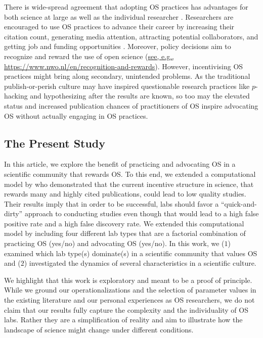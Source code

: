 \documentclass[meta, authordate,issue]{jote-new-article}
\begin{document}
There is wide-spread agreement that adopting OS practices has advantages for both science at large as well as the individual researcher \parencites{AllenMehler2019}{mckiernan_how_2016}{markowetz_five_2015}. Researchers are encouraged to use OS practices to advance their career by increasing their citation count, generating media attention, attracting potential collaborators, and getting job and funding opportunities \parencites{mckiernan_how_2016}. Moreover, policy decisions aim to recognize and reward the use of open science (\href{https://www.nwo.nl/en/recognition-and-rewards}{see, e.g., https://www.nwo.nl/en/recognition-and-rewards}). However, incentivising OS practices might bring along secondary, unintended problems. As the traditional publish-or-perish culture may have inspired questionable research practices like $p$-hacking and hypothesizing after the results are known, so too may the elevated status and increased publication chances of practitioners of OS inspire advocating OS without actually engaging in OS practices.

\subsection{The Present Study}

In this article, we explore the benefit of practicing and advocating OS in a scientific community that rewards OS. To this end, we extended a computational model by \textcite{SmaldinoMcelreath2016} who demonstrated that the current incentive structure in science, that rewards many and highly cited publications, could lead to low quality studies. Their results imply that in order to be successful, labs should favor a ``quick-and-dirty'' approach to conducting studies even though that would lead to a high false positive rate and a high false discovery rate. We extended this computational model by including four different lab types that are a factorial combination of practicing OS (yes/no) and advocating OS (yes/no). In this work, we ($1$) examined which lab type(s) dominate(s) in a scientific community that values OS and ($2$) investigated the dynamics of several characteristics in a scientific culture.

We highlight that this work is exploratory and meant to be a proof of principle. While we ground our operationalizations and the selection of parameter values in the existing literature and our personal experiences as OS researchers, we do not claim that our results fully capture the complexity and the individuality of OS labs. Rather they are a simplification of reality and aim to illustrate how the landscape of science might change under different conditions.
\end{document}
